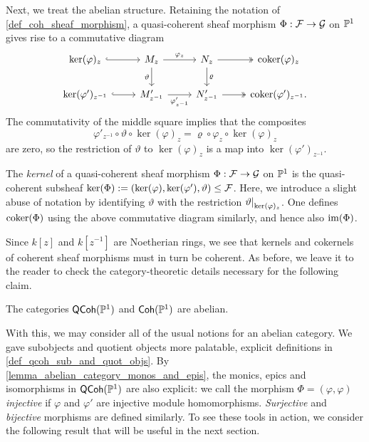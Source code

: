 Next, we treat the abelian structure.
Retaining the notation of \cref{def_coh_sheaf_morphism}, a
quasi-coherent sheaf morphism $\Phi: \mathcal{F} \to \mathcal{G}$ on
$\mathbb{P}^{{1}}$ gives rise to a commutative diagram
\[
  \begin{tikzcd}
    {\ker(\varphi)_z} & {M_z} & {N_z} & {\coker(\varphi)_z} \\
    {\ker(\varphi')_{z^{-1}}} & {M'_{z^{-1}}} & {N'_{z^{-1}}} &
    {\coker(\varphi')_{z^{-1}}}.
    \arrow[hook, from=1-1, to=1-2]
    \arrow["{\varphi_z}", from=1-2, to=1-3]
    \arrow["\vartheta"', from=1-2, to=2-2]
    \arrow[two heads, from=1-3, to=1-4]
    \arrow["\varrho", from=1-3, to=2-3]
    \arrow[hook, from=2-1, to=2-2]
    \arrow["{\varphi'_{z^{-1}}}"', from=2-2, to=2-3]
    \arrow[two heads, from=2-3, to=2-4]
  \end{tikzcd}
\]
The commutativity of the middle square implies that the composites
\[
  \varphi'_{z^{-1}} \circ \vartheta \circ \ker(\varphi)_z = \varrho
  \circ \varphi_z \circ \ker(\varphi)_z
\]
are zero, so the restriction of $\vartheta$ to $\ker(\varphi)_z$ is a
map into ${\ker(\varphi')_{z^{-1}}}$.

\begin{definition}
  The \emph{kernel} of a quasi-coherent sheaf morphism $\Phi: \mathcal{F}
  \to \mathcal{G}$ on $\mathbb{P}^{{1}}$ is the quasi-coherent subsheaf
  $\ker(\Phi) := (\ker(\varphi), \ker(\varphi'), \vartheta) \leq \mathcal{F}$.
  Here, we introduce a slight abuse of notation by identifying
  $\vartheta$ with the restriction $\setres{\vartheta}{\ker(\varphi)_z}$.
  One defines $\operatorname{coker}(\Phi)$ using the above commutative diagram
  similarly, and hence also $\operatorname{im}(\Phi)$.
\end{definition}

Since $k[z]$ and $k[z^{-1}]$ are Noetherian rings, we see that
kernels and cokernels of coherent sheaf morphisms must in turn be coherent.
As before, we leave it to the reader to check the category-theoretic
details necessary for the following claim.

\begin{proposition}
  The categories $\operatorname{\mathsf{QCoh}}(\mathbb{P}^{{1}})$ and $\operatorname{\mathsf{Coh}}(\mathbb{P}^{{1}})$ are abelian.
\end{proposition}

With this, we may consider all of the usual notions for an abelian category.
We gave subobjects and quotient objects more palatable, explicit
definitions in \cref{def_qcoh_sub_and_quot_objs}.
By \cref{lemma_abelian_category_monos_and_epis}, the monics, epics
and isomorphisms in $\operatorname{\mathsf{QCoh}}(\mathbb{P}^{{1}})$ are also explicit: we call the
morphism $\Phi = (\varphi, \varphi)$ \emph{injective} if $\varphi$
and $\varphi'$ are injective module homomorphisms. \emph{Surjective}
and \emph{bijective} morphisms are defined similarly.
To see these tools in action, we consider the following result that
will be useful in the next section.

